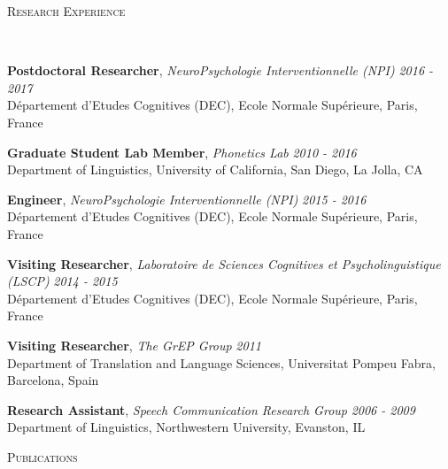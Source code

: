 \documentclass[9pt]{article}
\newenvironment{changemargin}[2]{%
  \begin{list}{}{%
    \setlength{\topsep}{0pt}%
    \setlength{\leftmargin}{#1}%
    \setlength{\rightmargin}{#2}%
    \setlength{\listparindent}{\parindent}%
    \setlength{\itemindent}{\parindent}%
    \setlength{\parsep}{\parskip}%
  }%
  \item[]}{\end{list}
}
\newcommand{\lineover}{
	\begin{changemargin}{-0.05in}{-0.05in}
		\vspace*{-8pt}
		\hrulefill \\
		\vspace*{-2pt}
	\end{changemargin}
}
\newcommand{\header}[1]{
	\begin{changemargin}{-0.5in}{-0.5in}
		\scshape{#1}\\
  	\lineover
	\end{changemargin}
}
\newenvironment{body} {
	\vspace*{-16pt}
	\begin{changemargin}{-0.25in}{-0.5in}
  }	
	{\end{changemargin}
}
\begin{document}
\smallskip


\header{Research Experience}

\begin{body}
	\vspace{14pt}
	\textbf{Postdoctoral Researcher}, \emph{NeuroPsychologie Interventionnelle (NPI)} \hfill \emph{2016 - 2017}\\
	D\'epartement d'Etudes Cognitives (DEC), Ecole Normale Sup\'erieure, Paris, France
	\medskip
	
	\textbf{Graduate Student Lab Member}, \emph{Phonetics Lab} \hfill \emph{2010 - 2016}\\
	Department of Linguistics, University of California, San Diego, La Jolla, CA\\
 	\medskip
	
	\textbf{Engineer}, \emph{NeuroPsychologie Interventionnelle (NPI)} \hfill \emph{2015 - 2016}\\
	D\'epartement d'Etudes Cognitives (DEC), Ecole Normale Sup\'erieure, Paris, France
	\medskip
	
	\textbf{Visiting Researcher}, \emph{Laboratoire de Sciences Cognitives et Psycholinguistique (LSCP)} \hfill \emph{2014 - 2015}\\
	D\'epartement d'Etudes Cognitives (DEC), Ecole Normale Sup\'erieure, Paris, France
	\medskip
	
	\textbf{Visiting Researcher}, \emph{The GrEP Group} \hfill \emph{2011}\\
	Department of Translation and Language Sciences, Universitat Pompeu Fabra, Barcelona, Spain
	\medskip
	
	\textbf{Research Assistant}, \emph{Speech Communication Research Group} \hfill \emph{2006 - 2009}\\
	Department of Linguistics, Northwestern University, Evanston, IL
\end{body}

\smallskip


\header{Publications}
\end{document}
